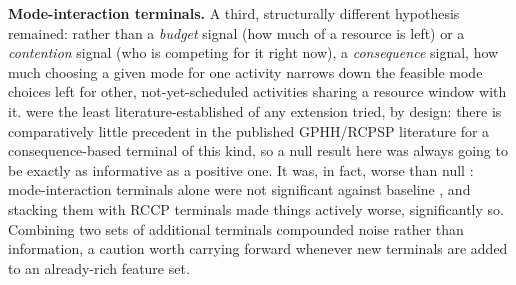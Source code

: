 \textbf{Mode-interaction terminals.} A third, structurally different
hypothesis remained: rather than a \emph{budget} signal (how much of a
resource is left) or a \emph{contention} signal (who is competing for it
right now), a \emph{consequence} signal, how much choosing a given mode for
one activity narrows down the feasible mode choices left for other,
not-yet-scheduled activities sharing a resource window with it.
were the least literature-established of any extension
tried, by design: there is comparatively little precedent in the published
GPHH/RCPSP literature for a consequence-based terminal of this kind, so a
null result here was always going to be exactly as informative as a
positive one. It was, in fact, worse than null
: mode-interaction
terminals alone were not significant against baseline
, and stacking
them with RCCP terminals made things actively worse, significantly so.
Combining two sets of additional
terminals compounded noise rather than information, a caution worth
carrying forward whenever new terminals are added to an already-rich
feature set.

